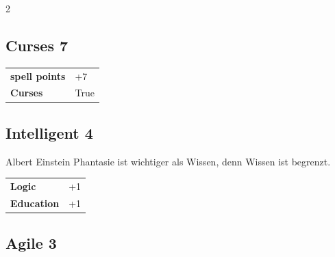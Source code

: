 \begin{multicols}{2}
\begin{tcolorbox}
\end{tcolorbox}

\begin{tcolorbox}
    \subsection*{Curses \hfill \small{7 }}
    \tcblower




\begin{tabular}{@{}ll@{}}
    \textbf{spell points} & +7\\
    \textbf{Curses} & True\\
\end{tabular}


\end{tcolorbox}

\begin{tcolorbox}
    \subsection*{Intelligent \hfill \small{4 }}
    \tcblower


\begin{pquote}{Albert Einstein}
Phantasie ist wichtiger als Wissen, denn Wissen ist begrenzt.
\end{pquote}

\vspace{3mm}

\begin{tabular}{@{}ll@{}}
    \textbf{Logic} & +1\\
    \textbf{Education} & +1\\
\end{tabular}


\end{tcolorbox}

\begin{tcolorbox}
    \subsection*{Agile \hfill \small{3 }}
    \tcblower





\end{tcolorbox}
\end{multicols}
